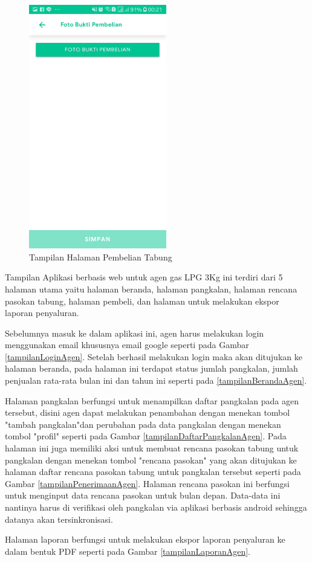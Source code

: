 \begin{figure}[H]
		\hspace{1cm}
		\includegraphics [width = 6cm]{gambar/android/bukti-pembelian}
		\caption{Tampilan Halaman Pembelian Tabung}
		\label{tampilanPembelianPangkalan}
	\end{figure}

	\par Tampilan Aplikasi berbasis web untuk agen gas LPG 3Kg ini terdiri dari 5 halaman utama yaitu halaman beranda, halaman pangkalan, halaman rencana pasokan tabung, halaman pembeli, dan halaman untuk melakukan ekspor laporan penyaluran.
	\par Sebelumnya masuk ke dalam aplikasi ini, agen harus melakukan login menggunakan email khususnya email google seperti pada Gambar \ref{tampilanLoginAgen}. Setelah berhasil melakukan login maka akan ditujukan ke halaman beranda, pada halaman ini terdapat status jumlah pangkalan, jumlah penjualan rata-rata bulan ini dan tahun ini seperti pada \ref{tampilanBerandaAgen}.
	\par Halaman pangkalan berfungsi untuk menampilkan daftar pangkalan pada agen tersebut, disini agen dapat melakukan penambahan dengan menekan tombol "tambah pangkalan"dan perubahan pada data pangkalan dengan menekan tombol "profil" seperti pada Gambar \ref{tampilanDaftarPangkalanAgen}. Pada halaman ini juga memiliki aksi untuk membuat rencana pasokan tabung untuk pangkalan dengan menekan tombol "rencana pasokan" yang akan ditujukan ke halaman daftar rencana pasokan tabung untuk pangkalan tersebut seperti pada Gambar \ref{tampilanPenerimaanAgen}. Halaman rencana pasokan ini berfungsi untuk menginput data rencana pasokan untuk bulan depan. Data-data ini nantinya harus di verifikasi oleh pangkalan via aplikasi berbasis android sehingga datanya akan tersinkronisasi.
	\par Halaman laporan berfungsi untuk melakukan ekspor laporan penyaluran ke dalam bentuk PDF seperti pada Gambar \ref{tampilanLaporanAgen}.
	
